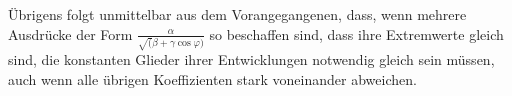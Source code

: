 \expandafter\def\csname HistoricalNoteText29\endcsname{Übrigens folgt unmittelbar aus dem Vorangegangenen, dass, wenn mehrere Ausdrücke der Form
$\frac{\alpha}{\surd(\beta+\gamma\cos\varphi)}$ so beschaffen sind, dass ihre
Extremwerte gleich sind, die konstanten Glieder ihrer Entwicklungen notwendig gleich sein müssen, auch wenn alle übrigen Koeffizienten stark voneinander abweichen.}
